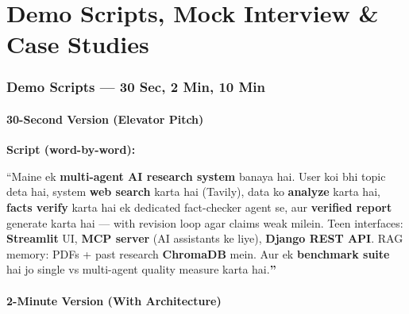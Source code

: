 \newpage

\part{Demo Scripts, Mock Interview \& Case Studies}

\section{Demo Scripts --- 30 Sec, 2 Min, 10 Min}

\subsection{30-Second Version (Elevator Pitch)}

\begin{interviewbox}
\textbf{Script (word-by-word):}

``Maine ek \textbf{multi-agent AI research system} banaya hai. User koi bhi topic deta hai, system \textbf{web search} karta hai (Tavily), data ko \textbf{analyze} karta hai, \textbf{facts verify} karta hai ek dedicated fact-checker agent se, aur \textbf{verified report} generate karta hai --- with revision loop agar claims weak milein. Teen interfaces: \textbf{Streamlit} UI, \textbf{MCP server} (AI assistants ke liye), \textbf{Django REST API}. RAG memory: PDFs + past research \textbf{ChromaDB} mein. Aur ek \textbf{benchmark suite} hai jo single vs multi-agent quality measure karta hai.\textbf{''}
\end{interviewbox}

\subsection{2-Minute Version (With Architecture)}

